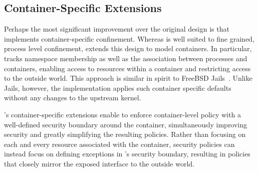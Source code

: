 
\subsection{Container-Specific Extensions}%
\label{ss:bpfcontain-extending}

Perhaps the most significant improvement over the original \bpfbox{} design is that
\bpfcontain{} implements container-specific confinement. Whereas \bpfbox{} is well suited
to fine grained, process level confinement, \bpfcontain{} extends this design to model
containers. In particular, \bpfcontain{} tracks namespace membership as well as the
association between processes and containers, enabling access to resources within
a container and restricting access to the outside world. This approach is similar in
spirit to FreeBSD Jails~\cite{kamp2000_jails}. Unlike Jails, however, the \bpfcontain{}
implementation applies such container specific defaults without any changes to the
upstream kernel.

\bpfcontain{}'s container-specific extensions enable \bpfcontain{} to enforce
container-level policy with a well-defined security boundary around the container,
simultaneously improving security and greatly simplifying the resulting policies. Rather
than focusing on each and every resource associated with the container, security policies
can instead focus on defining exceptions in \bpfcontain{}'s security boundary, resulting
in policies that closely mirror the exposed interface to the outside world.


